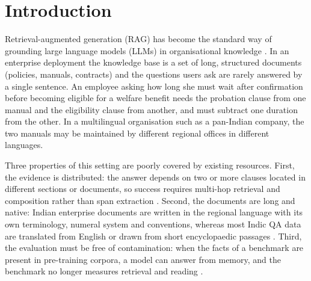 \documentclass[preprint,12pt]{elsarticle}
\begin{document}
\linenumbers

\section{Introduction}
\label{sec:intro}

Retrieval-augmented generation (RAG) has become the standard way of grounding large language models (LLMs) in organisational knowledge \cite{lewis2020rag,gao2023ragsurvey}. In an enterprise deployment the knowledge base is a set of long, structured documents (policies, manuals, contracts) and the questions users ask are rarely answered by a single sentence. An employee asking how long she must wait after confirmation before becoming eligible for a welfare benefit needs the probation clause from one manual and the eligibility clause from another, and must subtract one duration from the other. In a multilingual organisation such as a pan-Indian company, the two manuals may be maintained by different regional offices in different languages.

Three properties of this setting are poorly covered by existing resources. First, the evidence is distributed: the answer depends on two or more clauses located in different sections or documents, so success requires multi-hop retrieval and composition rather than span extraction \cite{yang2018hotpotqa,trivedi2022musique}. Second, the documents are long and native: Indian enterprise documents are written in the regional language with its own terminology, numeral system and conventions, whereas most Indic QA data are translated from English or drawn from short encyclopaedic passages \cite{lewis2020mlqa,doddapaneni2023indicxtreme}. Third, the evaluation must be free of contamination: when the facts of a benchmark are present in pre-training corpora, a model can answer from memory, and the benchmark no longer measures retrieval and reading \cite{sainz2023contamination}.
\end{document}
